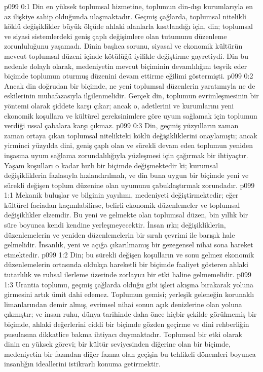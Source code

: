 \vs p099 0:1 Din en yüksek toplumsal hizmetine, toplumun din\hyp{}dışı kurumlarıyla en az ilişkiye sahip olduğunda ulaşmaktadır. Geçmiş çağlarda, toplumsal nitelikli köklü değişiklikler büyük ölçüde ahlaki alanlarla kısıtlandığı için, din; toplumsal ve siyasi sistemlerdeki geniş çaplı değişimlere olan tutumunu düzenleme zorunluluğunu yaşamadı. Dinin başlıca sorunu, siyasal ve ekonomik kültürün mevcut toplumsal düzeni içinde kötülüğü iyilikle değiştirme gayretiydi. Din bu nedenle dolaylı olarak, medeniyetin mevcut biçiminin devamlılığını teşvik eder biçimde toplumun oturmuş düzenini devam ettirme eğilimi göstermişti.
\vs p099 0:2 Ancak din doğrudan bir biçimde, ne yeni toplumsal düzenlerin yaratımıyla ne de eskilerinin muhafazasıyla ilgilenmelidir. Gerçek din, toplumun evrimleşmesinin bir yöntemi olarak şiddete karşı çıkar; ancak o, adetlerini ve kurumlarını yeni ekonomik koşullara ve kültürel gereksinimlere göre uyum sağlamak için toplumun verdiği ussal çabalara karşı çıkmaz.
\vs p099 0:3 Din, geçmiş yüzyılların zaman zaman ortaya çıkan toplumsal nitelikteki köklü değişikliklerini onaylamıştı; ancak yirminci yüzyılda dini, geniş çaplı olan ve sürekli devam eden toplumun yeniden inşasına uyum sağlama zorundalılığıyla yüzleşmesi için çağırmak bir ihtiyaçtır. Yaşam koşulları o kadar hızlı bir biçimde değişmektedir ki; kurumsal değişikliklerin fazlasıyla hızlandırılmalı, ve din buna uygun bir biçimde yeni ve sürekli değişen toplum düzenine olan uyumunu çabuklaştırmak zorundadır.
\vs p099 1:1 Mekanik buluşlar ve bilginin yayılımı, medeniyeti değiştirmektedir; eğer kültürel faciadan kaçınılabilirse, belirli ekonomik düzenlemeler ve toplumsal değişiklikler elzemdir. Bu yeni ve gelmekte olan toplumsal düzen, bin yıllık bir süre boyunca kendi kendine yerleşmeyecektir. İnsan ırkı; değişikliklerin, düzenlemelerin ve yeniden düzenlemelerin bir sıralı çevrimi ile barışık hale gelmelidir. İnsanlık, yeni ve açığa çıkarılmamış bir gezegensel nihai sona hareket etmektedir.
\vs p099 1:2 Din; bu sürekli değişen koşulların ve sonu gelmez ekonomik düzenlemelerin ortasında oldukça hareketli bir biçimde faaliyet gösteren ahlaki tutarlılık ve ruhsal ilerleme üzerinde zorlayıcı bir etki haline gelmemelidir.
\vs p099 1:3 Urantia toplumu, geçmiş çağlarda olduğu gibi işleri akışına bırakarak yoluna girmesini artık ümit dahi edemez. Toplumun gemisi; yerleşik geleneğin korunaklı limanlarından demir almış, evrimsel nihai sonun açık denizlerine olan yoluna çıkmıştır; ve insan ruhu, dünya tarihinde daha önce hiçbir şekilde görülmemiş bir biçimde, ahlaki değerlerini ciddi bir biçimde gözden geçirme ve dini rehberliğin pusulasına dikkatlice bakma ihtiyacı duymaktadır. Toplumsal bir etki olarak dinin en yüksek görevi; bir kültür seviyesinden diğerine olan bir biçimde, medeniyetin bir fazından diğer fazına olan geçişin bu tehlikeli dönemleri boyunca insanlığın ideallerini istikrarlı konuma getirmektir.
